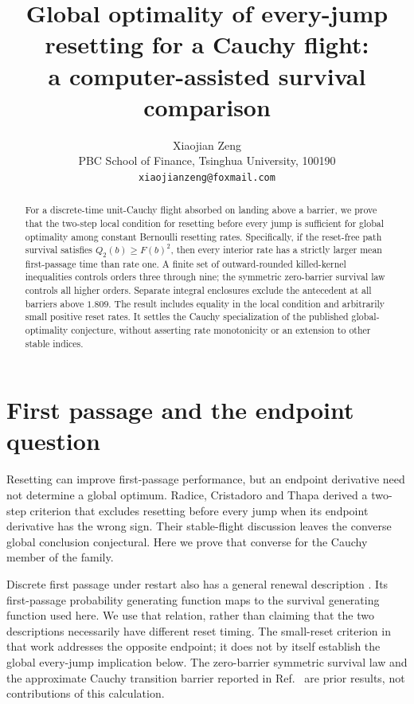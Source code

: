\documentclass[11pt]{article}
\title{Global optimality of every-jump resetting for a Cauchy flight:\\a computer-assisted survival comparison}
\author{Xiaojian Zeng\\\small PBC School of Finance, Tsinghua University, 100190\\\small\texttt{xiaojianzeng@foxmail.com}}
\date{}
\begin{document}
\maketitle
\begin{abstract}
For a discrete-time unit-Cauchy flight absorbed on landing above a barrier,
we prove that the two-step local condition for resetting before every jump
is sufficient for global optimality among constant Bernoulli resetting rates.
Specifically, if the reset-free path survival satisfies $Q_2(b)\ge F(b)^2$,
then every interior rate has a strictly larger mean first-passage time than
rate one. A finite set of outward-rounded killed-kernel inequalities controls
orders three through nine; the symmetric zero-barrier survival law controls
all higher orders. Separate integral enclosures exclude the antecedent at
all barriers above $1.809$. The result includes equality in the local
condition and arbitrarily small positive reset rates. It settles the Cauchy
specialization of the published global-optimality conjecture, without
asserting rate monotonicity or an extension to other stable indices.
\end{abstract}

\section{First passage and the endpoint question}
Resetting can improve first-passage performance, but an endpoint derivative
need not determine a global optimum. Radice, Cristadoro and Thapa
\cite{radice} derived a two-step criterion that excludes resetting before
every jump when its endpoint derivative has the wrong sign. Their stable-flight
discussion leaves the converse global conclusion conjectural. Here we prove
that converse for the Cauchy member of the family.

Discrete first passage under restart also has a general renewal description
\cite{bonomo}. Its first-passage probability generating function maps to the
survival generating function used here. We use that relation, rather than
claiming that the two descriptions necessarily have different reset timing.
The small-reset criterion in that work addresses the opposite endpoint;
it does not by itself establish the global every-jump implication below.
The zero-barrier symmetric survival law and the approximate Cauchy transition
barrier reported in Ref.~\cite{radice} are prior results, not contributions of
this calculation.
\end{document}
